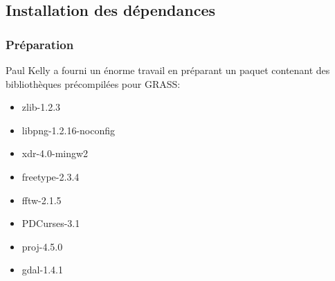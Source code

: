 % 
% 
% 
% 
% 
% 

\subsection{Installation des d\'ependances}
\subsubsection{Pr\'eparation}
Paul Kelly a fourni un \'enorme travail en pr\'eparant un paquet contenant des biblioth\`eques pr\'ecompil\'ees pour GRASS:

\begin{itemize}
\item zlib-1.2.3
\item libpng-1.2.16-noconfig
\item xdr-4.0-mingw2
\item freetype-2.3.4
\item fftw-2.1.5
\item PDCurses-3.1
\item proj-4.5.0
\item gdal-1.4.1
\end{itemize}

